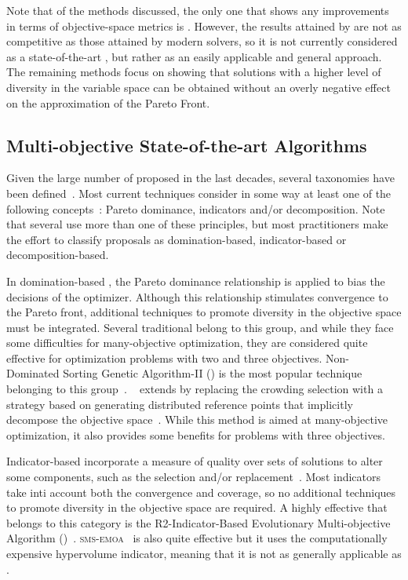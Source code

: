 Note that of the methods discussed, the only one that shows any improvements in terms of objective-space metrics is \GDEA{}.
%
However, the results attained by \GDEA{} are not as competitive as those attained by modern solvers, so it is not currently
considered as a state-of-the-art \MOEA{}, but rather as an easily applicable and general approach.
%
The remaining methods focus on showing that solutions with a higher level of diversity in the variable space
can be obtained without an overly negative effect
on the approximation of the Pareto Front.


\subsection{Multi-objective State-of-the-art Algorithms}

Given the large number of \MOEAS{} proposed in the last decades, several taxonomies have been defined~\cite{bechikh2016recent}.
%
Most current techniques consider in some way at least one of the following concepts~\cite{trivedi2016survey}:
Pareto dominance, indicators and/or decomposition.
%
Note that several \MOEAS{} use more than one of these principles, but most practitioners make the effort to classify
proposals as domination-based, indicator-based or decomposition-based.

In domination-based \MOEAS{}, the Pareto dominance relationship is applied to bias the decisions of the optimizer.
%
Although this relationship stimulates convergence to the Pareto front, additional techniques to promote
diversity in the objective space must be integrated.
%
Several traditional \MOEAS{} belong to this group, and while they face some difficulties for many-objective
optimization, they are considered quite effective for optimization problems with two and three objectives.
%
Non-Dominated Sorting Genetic Algorithm-II (\NSGAII{}) is the most popular technique belonging to this group~\cite{deb2002fast}.
%
\NSGAIII{}~\cite{deb2013evolutionary} extends \NSGAII{} by replacing the crowding selection with a strategy 
based on generating distributed reference points that implicitly decompose the objective space~\cite{trivedi2016survey}.
%
While this method is aimed at many-objective optimization, it also provides some benefits for problems with three objectives.

Indicator-based \MOEAS{} incorporate a measure of quality over sets of solutions to alter some components, such as the 
selection and/or replacement~\cite{zitzler2004indicator}.
%
Most indicators take inti account both the convergence and coverage, so no additional techniques to promote diversity
in the objective space are required.
%
A highly effective \MOEA{} that belongs to this category is the R2-Indicator-Based Evolutionary Multi-objective 
Algorithm (\RMOEA{})~\cite{trautmann2013r2}.
%
\textsc{sms-emoa}~\cite{beume:07} is also quite effective 
but it uses the computationally expensive hypervolume indicator, meaning that it is not as generally applicable as \RMOEA{}.

